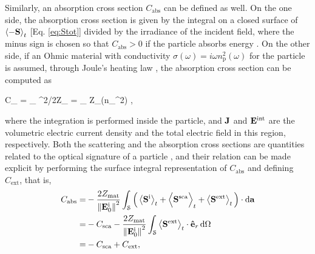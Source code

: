 Similarly, an absorption cross section $C_\text{abs}$ can be defined as well. On the one side, the absorption cross section is given by the integral on a closed surface of $\ev{-\vb{S}}_t$  [Eq. \eqref{eq:Stot}] divided by the irradiance of the incident field, where the minus sign is chosen so that $C_\text{abs}>0$ if the particle absorbs energy  \cite{bohren_absorption_1983}. On the other side, if an Ohmic material with conductivity $\sigma(\omega) = i\omega n_\text{p}^2(\omega)$ \cite{jackson_classical_1999} for the particle is assumed, through Joule's heating law \cite{tsang_scattering_2000}, the absorption cross section can be computed as
%
%
%
%
%
%
 \begin{tcolorbox}[title = Ohmic Particle - Absorption Cross Section,	ams align, breakable]
 	C_ =	 \int_ 
 									{^2/2Z_}
				= \int_ \omega Z_\Im(n_^2)  ,
 \label{eq:Cabs}
 \end{tcolorbox}%
%
\noindent
where the integration is performed inside the particle, and $\vb{J}$  and $\vb{E}^\text{int}$ are the volumetric electric current density and the total electric field in this region, respectively. Both the  scattering and the absorption cross sections are quantities related to the optical signature of a particle \cite{pellarin_forward_2019}, and their relation can be made explicit by performing the surface integral representation of $C_\text{abs}$ and defining $C_\text{ext}$, that is,
%
\begin{align}
C_\text{abs} = & - \frac{2Z_\text{mat}}{\norm{\vb{E}^\text{i}_0}^2}\int_\mathcal{S}
                        \Big(
                                \ev{\vb{S}^\text{i}}_t + \Bigl\langle\vb{S}^\text{sca}\Bigr\rangle_t + \ev{\vb{S}^\text{ext}}_t
                        \Big)\cdot\dd{\vb{a}}
					\notag \\
			=  & - C_\text{sca} - \frac{2Z_\text{mat}}{\norm{\vb{E}_0^\text{i}}^2}\int_\mathcal{S}
                        \ev{\vb{S}^\text{ext}}_t\cdot \vu{e}_r\dd{\Omega}
					\notag \\
			= & -C_\text{sca} + C_\text{ext},
\label{eq:CabsScaInt}
\end{align}
